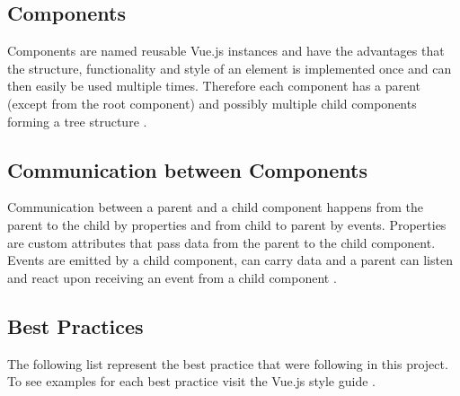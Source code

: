 \subsection{Components}
Components are named reusable Vue.js instances and have the advantages that the structure, functionality and style of an element is implemented once and can then easily be used multiple times. Therefore each component has a parent (except from the root component) and possibly multiple child components forming a tree structure \cite{Vue}. 

\subsection{Communication between Components}
Communication between a parent and a child component happens from the parent to the child by properties and from child to parent by events. Properties are custom attributes that pass data from the parent to the child component. Events are emitted by a child component, can carry data and a parent can listen and react upon receiving an event from a child component \cite{Vue}.

\subsection{Best Practices}
The following list represent the best practice that were following in this project. To see examples for each best practice visit the Vue.js style guide  \cite{VueStyleGuide}.

